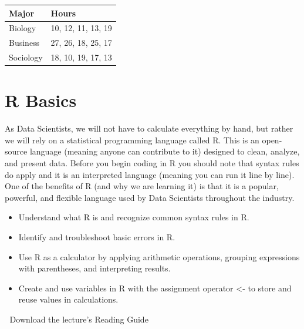 \documentclass[
  letterpaper,
  DIV=11,
  numbers=noendperiod]{scrreprt}
\providecommand{\tightlist}{%
  \setlength{\itemsep}{0pt}\setlength{\parskip}{0pt}}
\begin{document}
\begin{longtable}[]{@{}ll@{}}
\toprule\noalign{}
Major & Hours \\
\midrule\noalign{}
\endhead
\bottomrule\noalign{}
\endlastfoot
Biology & 10, 12, 11, 13, 19 \\
Business & 27, 26, 18, 25, 17 \\
Sociology & 18, 10, 19, 17, 13 \\
\end{longtable}


\chapter{R Basics}\label{r-basics}

As Data Scientists, we will not have to calculate everything by hand,
but rather we will rely on a statistical programming language called R.
This is an open-source language (meaning anyone can contribute to it)
designed to clean, analyze, and present data. Before you begin coding in
R you should note that syntax rules do apply and it is an interpreted
language (meaning you can run it line by line). One of the benefits of R
(and why we are learning it) is that it is a popular, powerful, and
flexible language used by Data Scientists throughout the industry.

\begin{itemize}
\tightlist
\item
  Understand what R is and recognize common syntax rules in R.
\item
  Identify and troubleshoot basic errors in R.
\item
  Use R as a calculator by applying arithmetic operations, grouping
  expressions with parentheses, and interpreting results.
\item
  Create and use variables in R with the assignment operator \textless-
  to store and reuse values in calculations.
\end{itemize}

\begin{tcolorbox}[enhanced jigsaw, colframe=quarto-callout-tip-color-frame, colback=white, breakable, rightrule=.15mm, title=\textcolor{quarto-callout-tip-color}{\faLightbulb}\hspace{0.5em}{Supplemental Material}, bottomtitle=1mm, toptitle=1mm, titlerule=0mm, left=2mm, coltitle=black, colbacktitle=quarto-callout-tip-color!10!white, leftrule=.75mm, opacitybacktitle=0.6, bottomrule=.15mm, opacityback=0, arc=.35mm, toprule=.15mm]

📄 Download the lecture's Reading Guide

\end{tcolorbox}
\end{document}

